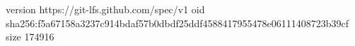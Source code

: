 version https://git-lfs.github.com/spec/v1
oid sha256:f5a67158a3237c914bdaf57b0dbdf25ddf4588417955478e06111408723b39cf
size 174916
